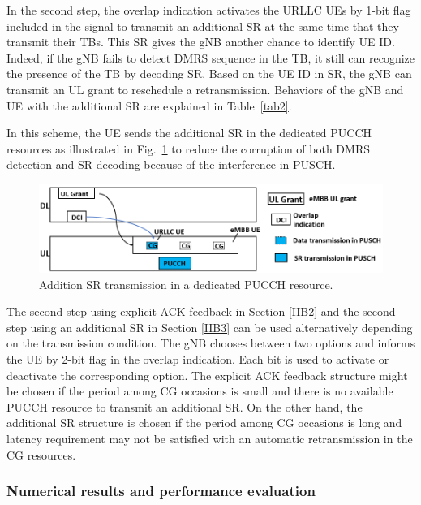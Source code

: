 \documentclass{ieeeaccess}
\begin{document}
In the second step, the overlap indication activates the URLLC UEs by 1-bit flag included in the signal to transmit an additional SR at the same time that they transmit their TBs. This SR gives the gNB another chance to identify UE ID. Indeed, if the gNB fails to detect DMRS sequence in the TB, it still can recognize the presence of the TB by decoding SR. Based on the UE ID in SR, the gNB can transmit an UL grant to reschedule a retransmission. Behaviors of the gNB and UE with the additional SR are explained in Table~\ref{tab2}.

In this scheme, the UE sends the additional SR in the dedicated PUCCH resources as illustrated in Fig.~\ref{fig3} to reduce the corruption of both DMRS detection and SR decoding because of the interference in PUSCH.

\begin{figure}[htbp]
\centerline{\includegraphics[scale=0.33]{fig3.PNG}}
\caption{Addition SR transmission in a dedicated PUCCH resource.}
\label{fig3}
\vspace{-2mm}
\end{figure}


The second step using explicit ACK feedback in Section \ref{IIB2} and the second step using an additional SR in Section \ref{IIB3} can be used alternatively depending on the transmission condition. The gNB chooses between two options and informs the UE by 2-bit flag in the overlap indication. Each bit is used to activate or deactivate the corresponding option. The explicit ACK feedback structure might be chosen if the period among CG occasions is small and there is no available PUCCH resource to transmit an additional SR. On the other hand, the additional SR structure is chosen if the period among CG occasions is long and latency requirement may not be satisfied with an automatic retransmission in the CG resources. 

\subsubsection{Numerical results and performance evaluation}
\end{document}
